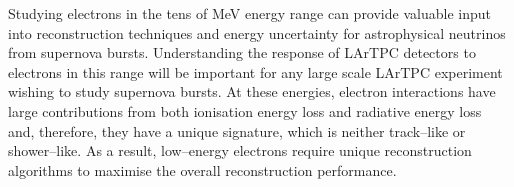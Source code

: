 % 
% 
% 

\minitoc

\noindent
Studying electrons in the tens of MeV energy range can provide valuable input 
into reconstruction techniques and energy uncertainty for astrophysical 
neutrinos from supernova bursts. Understanding the response of LArTPC 
detectors to electrons in this range will be important for any large scale 
LArTPC experiment wishing to study supernova bursts. At these energies,
electron interactions have large contributions from both ionisation energy 
loss and radiative energy loss and, therefore, they have a unique signature,
which is neither track--like or shower--like. As a result, low--energy electrons
require unique reconstruction algorithms to maximise the overall 
reconstruction performance. 

